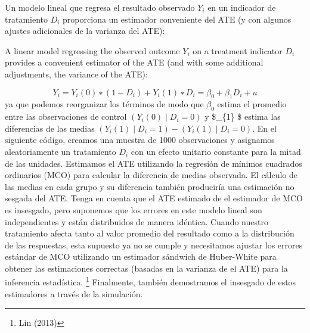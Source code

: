 \documentclass[
]{article}
\begin{document}
Un modelo lineal que regresa el resultado observado \(Y_ {i}\) en un
indicador de tratamiento \(D_ {i}\) proporciona un estimador conveniente
del ATE (y con algunos ajustes adicionales de la varianza del ATE):

A linear model regressing the observed outcome \(Y_{i}\) on a treatment
indicator \(D_{i}\) provides a convenient estimator of the ATE (and with
some additional adjustments, the variance of the ATE):

\[Y_{i}=Y_{i}(0)∗(1−D_{i})+Y_{i}(1)∗D_{i}=β_{0}+β_{1}D_{i}+u\] ya que
podemos reorganizar los términos de modo que \(\beta_{0}\) estima el
promedio entre las observaciones de control \((Y_ {i} (0) ∣D_ {i} = 0)\)
y \$\beta\_\{1\} \$ estima las diferencias de las medias
\((Y_ {i} (1) ∣D_ {i} = 1) - (Y_ {i} (1) ∣D_ {i} = 0)\). En el siguiente
código, creamos una muestra de 1000 observaciones y asignamos
aleatoriamente un tratamiento \(D_i\) con un efecto unitario constante
para la mitad de las unidades. Estimamos el ATE utilizando la regresión
de mínimos cuadrados ordinarios (MCO) para calcular la diferencia de
medias observada. El cálculo de las medias en cada grupo y su diferencia
también produciría una estimación no sesgada del ATE. Tenga en cuenta
que el ATE estimado de el estimador de MCO es insesgado, pero suponemos
que los errores en este modelo lineal son independientes y están
distribuidos de manera idéntica. Cuando nuestro tratamiento afecta tanto
al valor promedio del resultado como a la distribución de las
respuestas, esta supuesto ya no se cumple y necesitamos ajustar los
errores estándar de MCO utilizando un estimador sándwich de Huber-White
para obtener las estimaciones correctas (basadas en la varianza de el
ATE) para la inferencia estadística. \footnote{Lin (2013)} Finalmente,
también demostramos el insesgado de estos estimadores a través de la
simulación.
\end{document}
